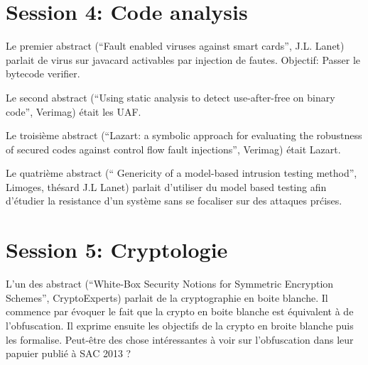 \documentclass{article}
\begin{document}
\section{Session 4: Code analysis}

Le premier abstract (``Fault enabled viruses against smart cards'', J.L. Lanet)  parlait de virus sur javacard activables par injection de fautes. Objectif: Passer le bytecode verifier.

Le second abstract (``Using static analysis to detect use-after-free on binary code'', Verimag) \'etait les UAF.

Le troisi\`eme abstract (``Lazart: a symbolic approach for evaluating the robustness of secured codes against control flow fault
injections'', Verimag) \'etait Lazart.

Le quatri\`eme abstract (`` Genericity of a model-based intrusion testing method'', Limoges, thésard J.L Lanet) parlait d'utiliser du model based testing afin d'\'etudier la resistance d'un syst\`eme sans se focaliser sur des attaques pr\'cises.


\section{Session 5: Cryptologie}

L'un des abstract (``White-Box Security Notions for Symmetric Encryption Schemes'', CryptoExperts) parlait de la cryptographie en boite blanche. Il commence par \'evoquer le fait que la crypto en boite blanche est \'equivalent \`a de l'obfuscation. Il exprime ensuite les objectifs de la crypto en broite blanche puis les formalise. Peut-être des chose intéressantes à voir sur l'obfuscation dans leur papuier publié à SAC 2013 ?
\end{document}

